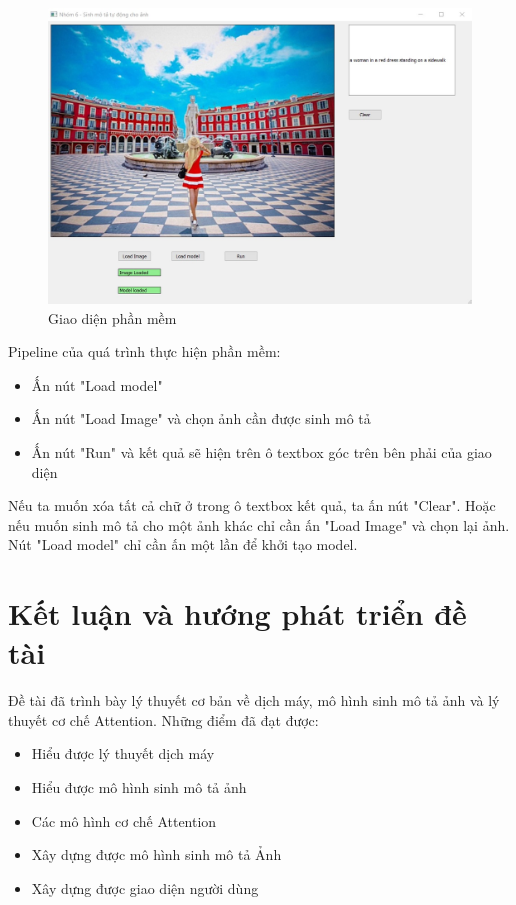 \documentclass[14pt, a4paper]{article}
\numberwithin{equation}{section}
\numberwithin{algorithm}{section}
\numberwithin{figure}{section}
\numberwithin{table}{section}
\numberwithin{dl}{section}
\numberwithin{md}{section}
\numberwithin{bd}{section}
\numberwithin{dn}{section}
\numberwithin{hq}{section}
\begin{document}
    \begin{figure}[h!] \centering

        \includegraphics[scale=0.5]{UI.jpg}
        \caption{Giao diện phần mềm}
        \label{fig:UI}

    \end{figure}

    Pipeline của quá trình thực hiện phần mềm:

    \begin{itemize}
        \item Ấn nút "Load model"
        \item Ấn nút "Load Image" và chọn ảnh cần được sinh mô tả
        \item Ấn nút "Run" và kết quả sẽ hiện trên ô textbox góc trên bên phải của giao diện
    \end{itemize}

    Nếu ta muốn xóa tất cả chữ ở trong ô textbox kết quả, ta ấn nút "Clear". 
    Hoặc nếu muốn sinh mô tả cho một ảnh khác chỉ cần ấn "Load Image" và chọn lại ảnh. 
    Nút "Load model" chỉ cần ấn một lần để khởi tạo model.
    \newpage
    \section{Kết luận và hướng phát triển đề tài}

    Đề tài đã trình bày lý thuyết cơ bản về dịch máy, mô hình sinh mô tả ảnh và lý thuyết cơ chế Attention.
    Những điểm đã đạt được:

    \begin{itemize}
        \item Hiểu được lý thuyết dịch máy
        \item Hiểu được mô hình sinh mô tả ảnh
        \item Các mô hình cơ chế Attention
        \item Xây dựng được mô hình sinh mô tả Ảnh
        \item Xây dựng được giao diện người dùng
    \end{itemize}
\end{document}
